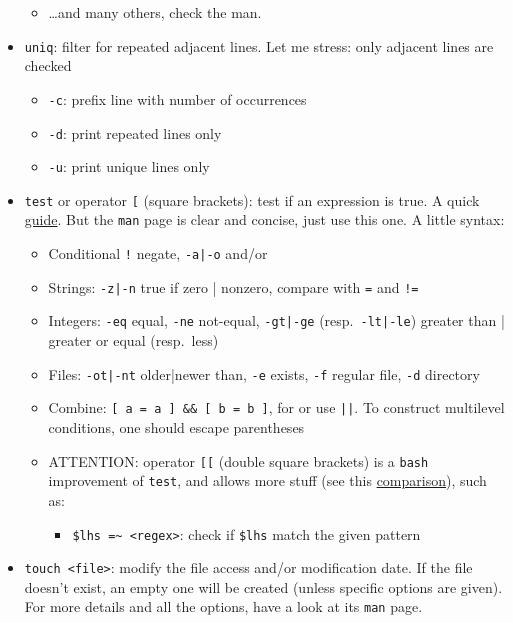 \documentclass[a4paper,12pt,%
              final%
              ]{article}
\begin{document}
\begin{itemize}
\begin{itemize}
      \item \ldots and many others, check the man.
    \end{itemize}
  \item \texttt{uniq}: filter for repeated adjacent lines. Let me stress: only adjacent lines are checked
    \begin{itemize}
      \item \verb|-c|: prefix line with number of occurrences
      \item \verb|-d|: print repeated lines only
      \item \verb|-u|: print unique lines only
    \end{itemize}
  \item \texttt{test} or operator \verb|[| (square brackets): test if an expression is true. A quick \href{https://www.computerhope.com/unix/test.htm}{guide}. But the \texttt{man} page is clear and concise, just use this one. A little syntax:
    \begin{itemize}
      \item Conditional \verb|!| negate, \verb!-a|-o! and/or
      \item Strings: \verb!-z|-n! true if zero | nonzero, compare with \verb|=| and \verb|!=|
      \item Integers: \verb|-eq| equal, \verb|-ne| not-equal, \verb!-gt|-ge! (resp.~\verb!-lt|-le!) greater than | greater or equal (resp.~less)
      \item Files: \verb!-ot|-nt! older|newer than, \verb|-e| exists, \verb|-f| regular file, \verb|-d| directory
      \item Combine: \verb|[ a = a ] && [ b = b ]|, for or use \verb!||!. To construct multilevel conditions, one should escape parentheses
      \item ATTENTION: operator \verb|[[| (double square brackets) is a \texttt{bash} improvement of \texttt{test}, and allows more stuff (see this \href{https://stackoverflow.com/a/47576482}{comparison}), such as:
        \begin{itemize}
          \item \verb|$lhs =~ <regex>|: check if \verb|$lhs| match the given pattern
        \end{itemize}
    \end{itemize}
  \item \verb|touch <file>|: modify the file access and/or modification date. If the file doesn't exist, an empty one will be created (unless specific options are given). For more details and all the options, have a look at its \texttt{man} page.\\

\end{itemize}
\end{document}

